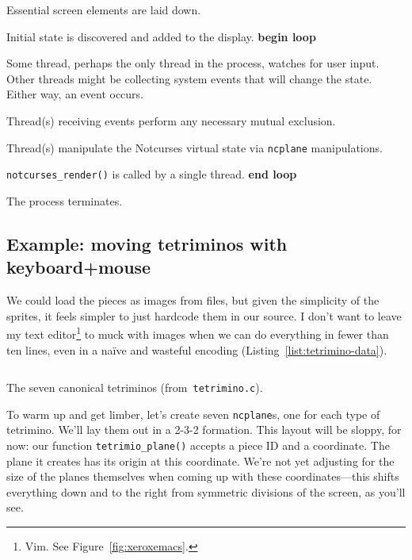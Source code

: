 \begin{denseitemize}
\item{Essential screen elements are laid down.}
\item{Initial state is discovered and added to the display.}
\textbf{begin loop} 
\item{Some thread, perhaps the only thread in the process, watches
    for user input. Other threads might be collecting system events that will
    change the state. Either way, an event occurs.}
\item{Thread(s) receiving events perform any necessary mutual exclusion.}
\item{Thread(s) manipulate the Notcurses virtual state via \texttt{ncplane} manipulations.}
\item{\texttt{notcurses\_render()} is called by a single thread.}
\textbf{end loop}
\item{The process terminates.}
\end{denseitemize}

\subsection{Example: moving tetriminos with keyboard+mouse}

We could load the pieces as images from files, but given the simplicity of the
sprites, it feels simpler to just hardcode them in our source. I don't want to
leave my text editor\footnote{Vim. See Figure~\ref{fig:xeroxemacs}.} to muck
with images when we can do everything in fewer than ten lines, even in a naïve
and wasteful encoding (Listing~\ref{list:tetrimino-data}).

\begin{listing}[!htbp]
\inputminted[]{C}{code/tetrimino-data.h}
\caption{The seven canonical tetriminos (from~\texttt{tetrimino.c}).}
\label{list:tetrimino-data}
\end{listing}

To warm up and get limber, let's create seven \texttt{ncplane}s, one for each type
of tetrimino. We'll lay them out in a 2-3-2 formation. This layout will be
sloppy, for now: our function
\texttt{tetrimio\_plane()} accepts a piece ID and a coordinate.
The plane it creates has its origin at this coordinate.
We're not yet adjusting for the size of the planes themselves when coming
up with these coordinates---this shifts everything down and to the right from
symmetric divisions of the screen, as you'll see.

